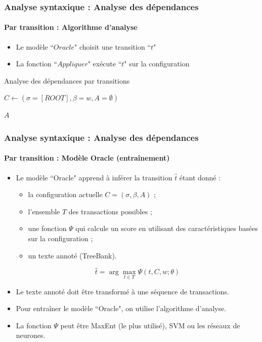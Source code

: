\documentclass[xcolor=table]{beamer}
\begin{document}
\begin{frame}
\frametitle{Analyse syntaxique : Analyse des dépendances}
\framesubtitle{Par transition : Algorithme d'analyse}

\begin{itemize}
	\item Le modèle ``$Oracle$" choisit une transition ``$t$"
	\item La fonction ``$Appliquer$" exécute ``$t$" sur la configuration
\end{itemize}

\begin{block}{Analyse des dépendances par transitions}
	\begin{algorithm}[H]
		
		$C \leftarrow (\sigma=[ROOT], \beta = w, A = \emptyset)$\;
		
		
	
		\Retour $A$ \;
	\end{algorithm}
\end{block}

\end{frame}

\begin{frame}
\frametitle{Analyse syntaxique : Analyse des dépendances}
\framesubtitle{Par transition : Modèle Oracle (entraînement)}

\begin{itemize}
	\item Le modèle ``Oracle" apprend à inférer la transition $\hat{t}$ étant donné :
	\begin{itemize}
		\item la configuration actuelle $ C = (\sigma, \beta, A) $ ;
		\item l'ensemble $T$ des transactions possibles ;
		\item une fonction $\Psi$ qui calcule un score en utilisant des caractéristiques basées sur la configuration ;
		\item un texte annoté (TreeBank).
	\end{itemize}
	\[ \hat{t} = \arg\max\limits_{t \in T} \Psi (t, C, w; \theta) \]
	
	\item Le texte annoté doit être transformé à une séquence de transactions.
	\item Pour entraîner le modèle ``Oracle", on utilise l'algorithme d'analyse.
	\item La fonction $\Psi$ peut être MaxEnt (le plus utilisé), SVM ou les réseaux de neurones.
\end{itemize}

\end{frame}
\end{document}
